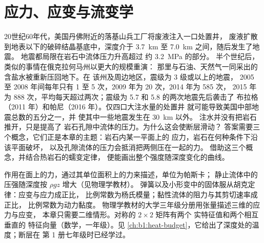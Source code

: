 \chapter{应力、应变与流变学}\label{ch:b1:stress-strain-rheology}

20世纪60年代，美国丹佛附近的落基山兵工厂将废液注入一口处置井，
废液扩散到地表以下的破碎结晶基底中，深度介于
\qty{3.7}{km} 至 \qty{7.0}{km} 之间，随后发生了地震。
地震都局限在岩石中流体压力升高超过
约 \qty{3.2}{MPa} 的部分。
半个世纪后，类似的事情在俄克拉何马州以更大的规模重演：
那里与石油、天然气一同采出的含盐水被重新压回地下。在
该州及周边地区，震级为 3 级或以上的地震，
2005 至 2008 年间每年只有 1 至 5 次，2009 年为 \num{20} 次，2014 年为 \num{585} 次，
2015 年为 \num{888} 次，平均每天超过两次；震级为 5.7 和 5.8 的两次地震先后袭击了
布拉格（2011 年）和帕尼（2016 年）。仅四口大注水量的处置井
就可能导致美国中部地震总数的五分之一，并
使其中一些地震发生在 \qty{30}{km} 以外。
注水并没有把岩石推开，只是提高了
岩石孔隙中流体的压力。为什么这会使断层滑动？
答案需要三个概念，它们正是本章的主题：岩石内某一平面上的
应力，岩石在何种条件下沿该平面破坏，
以及孔隙流体的压力会抵消把两侧压在一起的力。
借助这三个概念，并结合热岩石的蠕变定律，
便能画出整个强度随深度变化的曲线。

\begin{recall}
作用在面上的力，通过其单位面积上的力来描述，单位为帕斯卡；
静止流体中的压强随深度按 $\rho g z$ 增大（见物理学教材）。
弹簧以及小形变中的固体服从胡克定律：应变与应力成正比，
比例常数为杨氏模量；黏性流体的阻力与其剪切速率成正比，
比例常数为动力黏度。
物理学教材的大学三年级分册用张量描述三维的应力与应变，
本章只需要二维情形。对称的 $2\times2$ 矩阵有两个
实特征值和两个相互垂直的
特征向量（数学，一年级）。见
\cref{ch:b1:heat-budget}，它给出了深度处的温度；断层在
第 1 册七年级时已经学过。
\end{recall}

